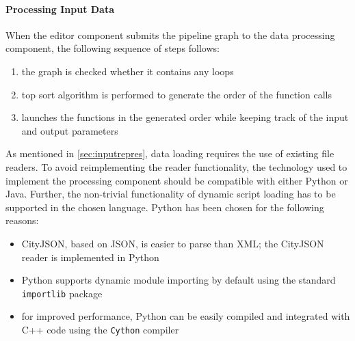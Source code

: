 \paragraph{Processing Input Data} When the editor component submits the pipeline graph to the data processing component, the following sequence of steps follows:
\begin{enumerate}
    \item the graph is checked whether it contains any loops
    \item top sort algorithm is performed to generate the order of the function calls
    \item launches the functions in the generated order while keeping track of the input and output parameters  
\end{enumerate} 

As mentioned in \ref{sec:inputrepres}, data loading requires the use of existing file readers. To avoid reimplementing the reader functionality, the technology used to implement the processing component should be compatible with either Python or Java. Further, the non-trivial functionality of dynamic script loading has to be supported in the chosen language. Python has been chosen for the following reasons:
\begin{itemize}[noitemsep]
    \item CityJSON, based on JSON, is easier to parse than XML; the CityJSON reader is implemented in Python
    \item Python supports dynamic module importing by default using the standard \verb|importlib| package
    \item for improved performance, Python can be easily compiled and integrated with C++ code using the \verb|Cython| compiler
\end{itemize}


